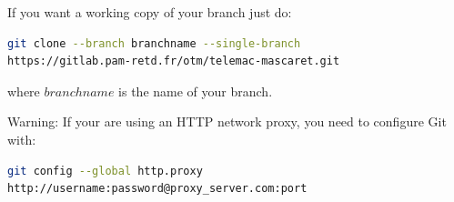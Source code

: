 If you want a working copy of your branch just do:
\begin{lstlisting}[language=bash]
git clone --branch branchname --single-branch
https://gitlab.pam-retd.fr/otm/telemac-mascaret.git
\end{lstlisting}
where $branchname$ is the name of your branch.\\
%
\begin{WarningBlock}{Warning:}
If your are using an HTTP network proxy, you need to configure Git with:
\begin{lstlisting}[language=bash]
git config --global http.proxy
http://username:password@proxy_server.com:port
\end{lstlisting}
\end{WarningBlock}
%
%
